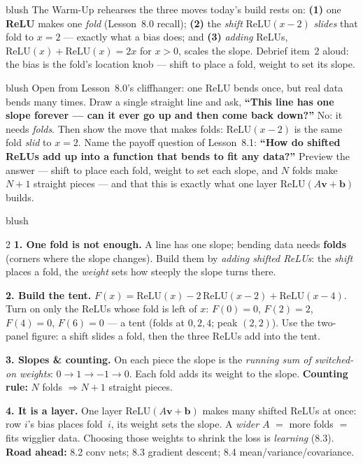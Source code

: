 \documentclass[10pt]{article}
\newcommand{\vv}{\mathbf{v}}
\newcommand{\bb}{\mathbf{b}}
\newcommand{\relu}{\mathrm{ReLU}}
\begin{document}
\begin{fixedskillbox}{blush}
    The Warm-Up rehearses the three moves today's build rests on: \textbf{(1)} one \textbf{ReLU} makes one
    \emph{fold} (Lesson~8.0 recall); \textbf{(2)} the \emph{shift} $\relu(x-2)$ \emph{slides} that fold to
    $x=2$ --- exactly what a bias does; and \textbf{(3)} \emph{adding} ReLUs, $\relu(x)+\relu(x)=2x$ for
    $x>0$, scales the slope. Debrief item~2 aloud: the bias is the fold's location knob --- shift to place a
    fold, weight to set its slope.
\end{fixedskillbox}

\begin{skillbox}[Hook]{blush}
    Open from Lesson~8.0's cliffhanger: one ReLU bends once, but real data bends many times. Draw a single
    straight line and ask, \textbf{``This line has one slope forever --- can it ever go up and then come back
    down?''} No: it needs \emph{folds}. Then show the move that makes folds: $\relu(x-2)$ is the same fold
    \emph{slid} to $x=2$. Name the payoff question of Lesson~8.1: \textbf{``How do shifted ReLUs add up into a
    function that bends to fit any data?''} Preview the answer --- shift to place each fold, weight to set
    each slope, and $N$ folds make $N+1$ straight pieces --- and that this is exactly what one layer
    $\relu(A\vv+\bb)$ builds.
\end{skillbox}

\begin{skillbox}[Lesson]{blush}
\begin{multicols}{2}
\textbf{1. One fold is not enough.} A line has one slope; bending data needs \textbf{folds} (corners where
the slope changes). Build them by \emph{adding shifted ReLUs}: the \emph{shift} places a fold, the
\emph{weight} sets how steeply the slope turns there.

\textbf{2. Build the tent.} $F(x)=\relu(x)-2\,\relu(x-2)+\relu(x-4)$. Turn on only the ReLUs whose fold is
left of $x$: $F(0)=0$, $F(2)=2$, $F(4)=0$, $F(6)=0$ --- a tent (folds at $0,2,4$; peak $(2,2)$). Use the
two-panel figure: a shift slides a fold, then the three ReLUs add into the tent.

\columnbreak

\textbf{3. Slopes \& counting.} On each piece the slope is the \emph{running sum of switched-on weights}:
$0\to1\to-1\to0$. Each fold adds its weight to the slope. \textbf{Counting rule:} $N$ folds $\Rightarrow
N+1$ straight pieces.

\textbf{4. It is a layer.} One layer $\relu(A\vv+\bb)$ makes many shifted ReLUs at once: row $i$'s bias
places fold~$i$, its weight sets the slope. A \emph{wider} $A$ $=$ more folds $=$ fits wigglier data.
Choosing those weights to shrink the loss is \emph{learning} (8.3). \textbf{Road ahead:} 8.2 conv nets; 8.3
gradient descent; 8.4 mean/variance/covariance.
\end{multicols}
\end{skillbox}
\end{document}
